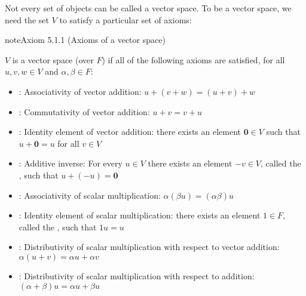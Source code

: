 \documentclass[letterpaper,10pt,english]{jupyterBook}
\begin{document}
\sphinxAtStartPar
Not every set of objects can be called a vector space. To be a vector space, we need the set \(V\) to satisfy a particular set of axioms:

\ignorespaces \label{_pages/5.1_Vector_spaces_definitions:vector-space-axioms}
\begin{sphinxadmonition}{note}{Axiom 5.1.1 (Axioms of a vector space)}



\sphinxAtStartPar
\(V\) is a vector space (over \(F\)) if all of the following axioms are satisfied, for all \(u, v, w \in V\) and \(\alpha, \beta \in F\):
\begin{itemize}
\item {} 
\sphinxAtStartPar
{}: Associativity of vector addition: \(u + (v + w) = (u + v) + w\)

\item {} 
\sphinxAtStartPar
{}: Commutativity of vector addition: \(u + v = v + u\)

\item {} 
\sphinxAtStartPar
{}: Identity element of vector addition: there exists an element \(\mathbf{0} \in V\) such that \(u + \mathbf{0} = u\) for all \(v \in V\)

\item {} 
\sphinxAtStartPar
{}: Additive inverse: For every \(u \in V\) there exists an element \(- v \in V\), called the , such that \(u + (- u) = \mathbf{0}\)

\item {} 
\sphinxAtStartPar
{}: Associativity of scalar multiplication: \(\alpha(\beta u) = (\alpha \beta) u\)

\item {} 
\sphinxAtStartPar
{}: Identity element of scalar multiplication: there exists an element \(1 \in F\), called the , such that \(1 u = u\)

\item {} 
\sphinxAtStartPar
{}: Distributivity of scalar multiplication with respect to vector addition: \(\alpha(u + v) = \alpha u + \alpha v\)

\item {} 
\sphinxAtStartPar
{}: Distributivity of scalar multiplication with respect to addition: \((\alpha + \beta)u = \alpha u + \beta u\)

\end{itemize}
\end{sphinxadmonition}
\end{document}
